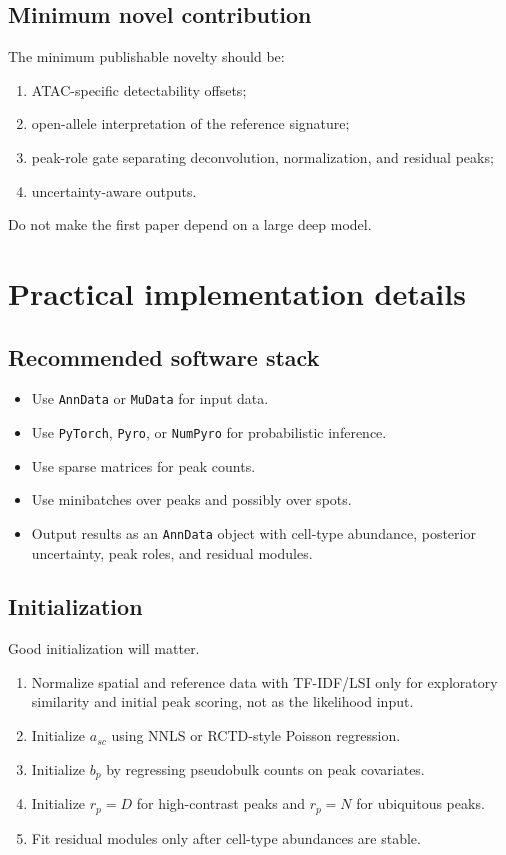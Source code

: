 \documentclass[11pt]{article}
\begin{document}
\subsection{Minimum novel contribution}

The minimum publishable novelty should be:
\begin{enumerate}
    \item ATAC-specific detectability offsets;
    \item open-allele interpretation of the reference signature;
    \item peak-role gate separating deconvolution, normalization, and residual peaks;
    \item uncertainty-aware outputs.
\end{enumerate}

Do not make the first paper depend on a large deep model.

\section{Practical implementation details}

\subsection{Recommended software stack}

\begin{itemize}
    \item Use \texttt{AnnData} or \texttt{MuData} for input data.
    \item Use \texttt{PyTorch}, \texttt{Pyro}, or \texttt{NumPyro} for probabilistic inference.
    \item Use sparse matrices for peak counts.
    \item Use minibatches over peaks and possibly over spots.
    \item Output results as an \texttt{AnnData} object with cell-type abundance, posterior uncertainty, peak roles, and residual modules.
\end{itemize}

\subsection{Initialization}

Good initialization will matter.

\begin{enumerate}
    \item Normalize spatial and reference data with TF-IDF/LSI only for exploratory similarity and initial peak scoring, not as the likelihood input.
    \item Initialize $a_{sc}$ using NNLS or RCTD-style Poisson regression.
    \item Initialize $b_p$ by regressing pseudobulk counts on peak covariates.
    \item Initialize $r_p=D$ for high-contrast peaks and $r_p=N$ for ubiquitous peaks.
    \item Fit residual modules only after cell-type abundances are stable.
\end{enumerate}
\end{document}

